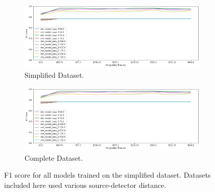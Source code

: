 \begin{figure}[H]
     \centering
     \begin{subfigure}[b]{0.9\textwidth}
         \centering
         \includegraphics[width=\textwidth]{images/results_easy_distance_comparison}
         \caption{Simplified Dataset.}
         \label{fig:results_easy_distance_comparison_simple}
     \end{subfigure}

     \begin{subfigure}[b]{0.9\textwidth}
         \centering
         \includegraphics[width=\textwidth]{images/results_easy_distance_comparison}
         \caption{Complete Dataset.}
         \label{fig:results_easy_distance_comparison_full}
     \end{subfigure}
        \caption{F1 score for all models trained on the simplified dataset. Datasets included here used various source-detector distance.}
        \label{fig:results_easy_distance_comparison}
\end{figure}

